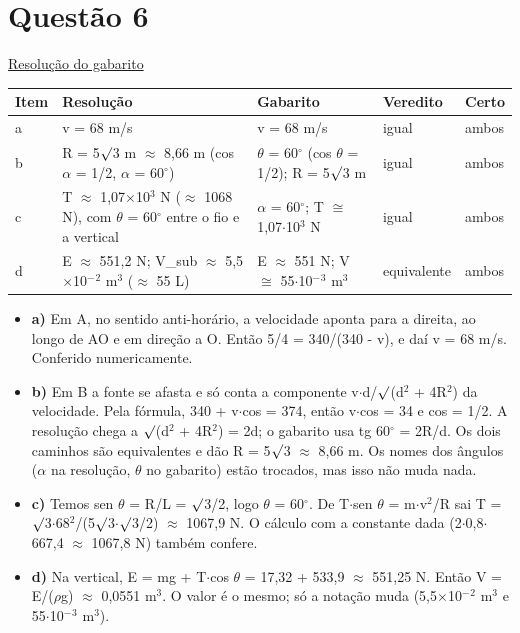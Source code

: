 \documentclass{article}%
\begin{document}
\section*{Questão 6}%
\href{https://poliedroresolve.sistemapoliedro.com.br/vestibulares/ime/2027/ime-2-fase-dia-2-27-10-2026-2-fase-dia-2/dissertativa-6-fisica-2-fase-dia-2-ime-2027}{Resolução do gabarito}\par\smallskip%
\begin{longtable}{@{}p{} p{} p{} p{} p{}@{}}\toprule Item & Resolução & Gabarito & Veredito & Certo \\ \midrule
a & v = 68 m/s & v = 68 m/s & igual & ambos \\
b & R = 5$\surd$3 m $\approx$ 8,66 m (cos $\alpha$ = 1/2, $\alpha$ = 60$^\circ$) & $\theta$ = 60$^\circ$ (cos $\theta$ = 1/2); R = 5$\surd$3 m & igual & ambos \\
c & T $\approx$ 1,07$\times$10$^3$ N ($\approx$ 1068 N), com $\theta$ = 60$^\circ$ entre o fio e a vertical & $\alpha$ = 60$^\circ$; T $\cong$ 1,07$\cdot$10$^3$ N & igual & ambos \\
d & E $\approx$ 551,2 N; V\_sub $\approx$ 5,5$\times$10$^{-}$$^2$ m$^3$ ($\approx$ 55 L) & E $\approx$ 551 N; V $\cong$ 55$\cdot$10$^{-}$$^3$ m$^3$ & equivalente & ambos \\
\bottomrule\end{longtable}%
\begin{itemize}%
\item%
\textbf{a)} Em A, no sentido anti{-}horário, a velocidade aponta para a direita, ao longo de AO e em direção a O. Então 5/4 = 340/(340 - v), e daí v = 68 m/s. Conferido numericamente.%
\item%
\textbf{b)} Em B a fonte se afasta e só conta a componente v$\cdot$d/$\surd$(d$^2$ + 4R$^2$) da velocidade. Pela fórmula, 340 + v$\cdot$cos = 374, então v$\cdot$cos = 34 e cos = 1/2. A resolução chega a $\surd$(d$^2$ + 4R$^2$) = 2d; o gabarito usa tg 60$^\circ$ = 2R/d. Os dois caminhos são equivalentes e dão R = 5$\surd$3 $\approx$ 8,66 m. Os nomes dos ângulos ($\alpha$ na resolução, $\theta$ no gabarito) estão trocados, mas isso não muda nada.%
\item%
\textbf{c)} Temos sen $\theta$ = R/L = $\surd$3/2, logo $\theta$ = 60$^\circ$. De T$\cdot$sen $\theta$ = m$\cdot$v$^2$/R sai T = $\surd$3$\cdot$68$^2$/(5$\surd$3$\cdot$$\surd$3/2) $\approx$ 1067,9 N. O cálculo com a constante dada (2$\cdot$0,8$\cdot$667,4 $\approx$ 1067,8 N) também confere.%
\item%
\textbf{d)} Na vertical, E = mg + T$\cdot$cos $\theta$ = 17,32 + 533,9 $\approx$ 551,25 N. Então V = E/($\rho$g) $\approx$ 0,0551 m$^3$. O valor é o mesmo; só a notação muda (5,5$\times$10$^{-}$$^2$ m$^3$ e 55$\cdot$10$^{-}$$^3$ m$^3$).%
\end{itemize}%
\end{document}
